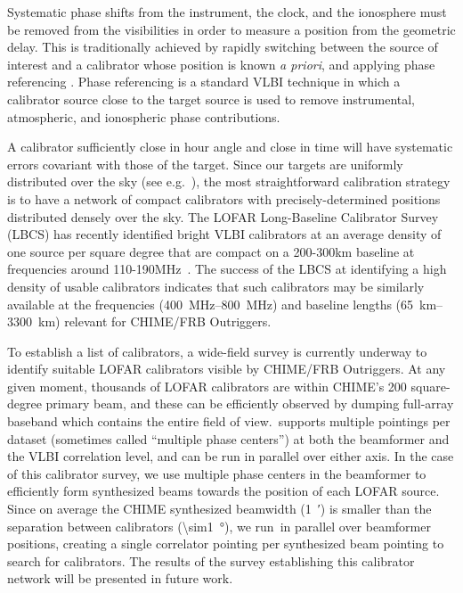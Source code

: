 Systematic phase shifts from the instrument, the clock, and the ionosphere must be removed from the visibilities in order to measure a position from the geometric delay. This is traditionally achieved by rapidly switching between the source of interest and a calibrator whose position is known \textit{a priori}, and applying phase referencing \citep{beasley1995vlbi}. Phase referencing is a standard VLBI technique in which a calibrator source close to the target source is used to remove
instrumental, atmospheric, and ionospheric phase contributions. 

A calibrator sufficiently close in hour angle and close in time will have systematic errors covariant with those of the target. Since our targets are uniformly distributed over the sky (see e.g.~\citep{josephy2021no}), the most straightforward calibration strategy is to have a network of compact calibrators with precisely-determined positions distributed densely over the sky. The LOFAR Long-Baseline Calibrator Survey (LBCS) has recently identified bright VLBI calibrators at an average density of one source per square degree that are compact on a 200-300km baseline at frequencies around 110-190MHz~\citep{mold_on2015lofar,jackson2022sub,morabito2022sub}. The success of the LBCS at identifying a high density of usable calibrators indicates that such calibrators may be similarly available at the frequencies (\SIrange{400}{800}{\mega\hertz}) and baseline lengths (\SIrange{65}{3300}{\kilo\meter}) relevant for CHIME/FRB Outriggers. 

To establish a list of calibrators, a wide-field survey is currently underway to identify suitable LOFAR calibrators visible by CHIME/FRB Outriggers. At any given moment, thousands of LOFAR calibrators are within CHIME's 200 square-degree primary beam, and these can be efficiently observed by dumping full-array baseband which contains the entire field of view.~\corrname supports multiple pointings per dataset (sometimes called ``multiple phase centers'') at
both the beamformer and the VLBI correlation level, and can be run in parallel over either axis. In the case of this
calibrator survey, we use multiple phase centers in the beamformer to efficiently form synthesized beams towards the position of each LOFAR source. Since on average the CHIME synthesized beamwidth (\SI{1}{\arcmin}) is smaller than the separation between calibrators (\SI{\sim1}{\degree}), we run~\corrname in parallel over beamformer positions, creating a single correlator pointing per synthesized beam pointing to search for calibrators. The results of the survey establishing this calibrator network will be presented in future work.

